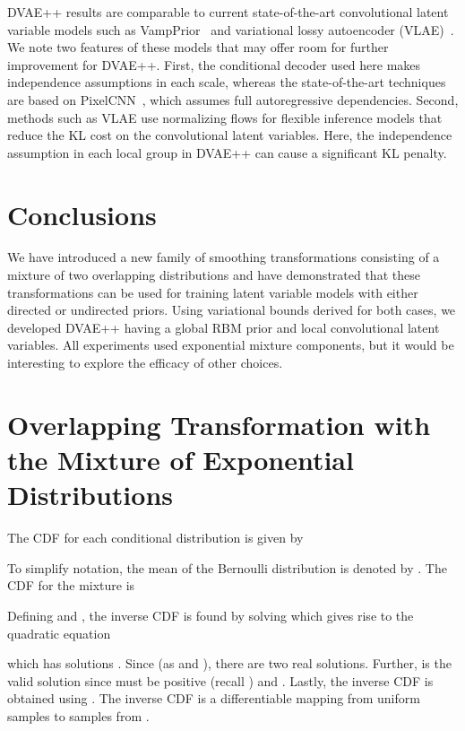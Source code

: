\documentclass{article}
\begin{document}
DVAE++ results are comparable to current state-of-the-art convolutional latent variable models such as VampPrior~\cite{tomczak2017vae} and variational lossy autoencoder (VLAE)~\cite{chen2016variational}. We note two features of these models that may offer room for further improvement for DVAE++. First, the conditional decoder used here makes independence 
assumptions in each scale, whereas the state-of-the-art techniques are based on PixelCNN~\cite{van2016pixel}, which assumes full autoregressive dependencies. Second, methods such as VLAE use normalizing flows for flexible inference models that reduce the KL cost on the convolutional latent variables. Here, the independence assumption in each local group in
DVAE++ can cause a significant KL penalty. 

\section{Conclusions}
We have introduced a new family of smoothing transformations consisting 
of a mixture of two overlapping distributions and have demonstrated that
these transformations can be used for training latent variable models
with either directed or undirected priors. Using variational bounds
derived for both cases, we developed DVAE++ having a global RBM prior
and local convolutional latent variables. All experiments used exponential mixture components, but it
would be interesting to explore the efficacy of other choices.




\clearpage
\appendix
\section{Overlapping Transformation with the Mixture of Exponential Distributions} \label{app:overlap}

The CDF for each conditional distribution is given by

To simplify notation, the mean of the Bernoulli distribution  is denoted by . The CDF for the 
mixture  is

Defining  and , the inverse CDF
is found by solving  which gives rise to the quadratic equation

which has solutions . Since  
(as  and ), there are two real solutions. Further,  is the valid solution since 
 must be positive (recall ) and .
Lastly, the inverse CDF is obtained using . The inverse CDF is a differentiable mapping from uniform samples 
 to samples from .
\end{document}
